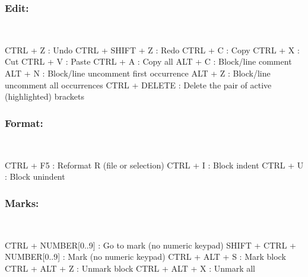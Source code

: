 \subsubsection{Edit:}\\

\vspace{-0.5cm}
\begin{Rtables}[caption={[Edit menu keyboard shortcuts]
    Edit menu keyboard shortcuts},
  label=menu:edit]
  CTRL + Z         : Undo
  CTRL + SHIFT + Z : Redo
  CTRL + C         : Copy
  CTRL + X         : Cut
  CTRL + V         : Paste
  CTRL + A         : Copy all
  ALT  + C         : Block/line comment
  ALT  + N         : Block/line uncomment first occurrence
  ALT  + Z         : Block/line uncomment all occurrences
  CTRL + DELETE    : Delete the pair of active (highlighted) brackets
\end{Rtables}


\newpage
\subsubsection{Format:}\\

\vspace{-0.5cm}
\begin{Rtables}[caption={[Format menu keyboard shortcuts]
    Format menu keyboard shortcuts},
  label=menu:format]
  CTRL + F5 : Reformat R (file or selection)
  CTRL + I  : Block indent
  CTRL + U  : Block unindent
\end{Rtables}


\subsubsection{Marks:}\\

\vspace{-0.5cm}
\begin{Rtables}[caption={[Marks menu keyboard shortcuts]
    Marks menu keyboard shortcuts},
  label=menu:marks]
  CTRL  + NUMBER[0..9]        : Go to mark (no numeric keypad)
  SHIFT + CTRL + NUMBER[0..9] : Mark (no numeric keypad)
  CTRL  + ALT  + S            : Mark block
  CTRL  + ALT  + Z            : Unmark block
  CTRL  + ALT  + X            : Unmark all
\end{Rtables}


